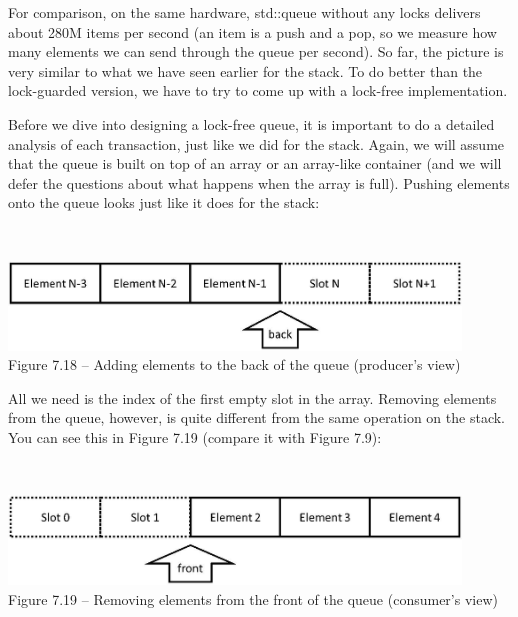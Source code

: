 For comparison, on the same hardware, std::queue without any locks delivers about 280M items per second (an item is a push and a pop, so we measure how many elements we can send through the queue per second). So far, the picture is very similar to what we have seen earlier for the stack. To do better than the lock-guarded version, we have to try to come up with a lock-free implementation.


Before we dive into designing a lock-free queue, it is important to do a detailed analysis of each transaction, just like we did for the stack. Again, we will assume that the queue is built on top of an array or an array-like container (and we will defer the questions about what happens when the array is full). Pushing elements onto the queue looks just like it does for the stack: 

\hspace*{\fill} \\ %
\begin{center}
\includegraphics[width=0.9\textwidth]{content/2/chapter7/images/18.jpg}\\
Figure 7.18 – Adding elements to the back of the queue (producer's view)
\end{center}

All we need is the index of the first empty slot in the array. Removing elements from the queue, however, is quite different from the same operation on the stack. You can see this  in Figure 7.19 (compare it with Figure 7.9):

\hspace*{\fill} \\ %
\begin{center}
\includegraphics[width=0.9\textwidth]{content/2/chapter7/images/19.jpg}\\
Figure 7.19 – Removing elements from the front of the queue (consumer's view)
\end{center}

